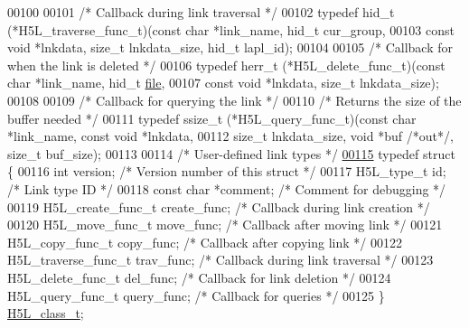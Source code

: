 \begin{DoxyCode}
00100 
00101 \textcolor{comment}{/* Callback during link traversal */}
00102 \textcolor{keyword}{typedef} hid\_t (*H5L\_traverse\_func\_t)(\textcolor{keyword}{const} \textcolor{keywordtype}{char} *link\_name, hid\_t cur\_group,
00103     \textcolor{keyword}{const} \textcolor{keywordtype}{void} *lnkdata, \textcolor{keywordtype}{size\_t} lnkdata\_size, hid\_t lapl\_id);
00104 
00105 \textcolor{comment}{/* Callback for when the link is deleted */}
00106 \textcolor{keyword}{typedef} herr\_t (*H5L\_delete\_func\_t)(\textcolor{keyword}{const} \textcolor{keywordtype}{char} *link\_name, hid\_t \hyperlink{structfile}{file},
00107     \textcolor{keyword}{const} \textcolor{keywordtype}{void} *lnkdata, \textcolor{keywordtype}{size\_t} lnkdata\_size);
00108 
00109 \textcolor{comment}{/* Callback for querying the link */}
00110 \textcolor{comment}{/* Returns the size of the buffer needed */}
00111 \textcolor{keyword}{typedef} ssize\_t (*H5L\_query\_func\_t)(\textcolor{keyword}{const} \textcolor{keywordtype}{char} *link\_name, \textcolor{keyword}{const} \textcolor{keywordtype}{void} *lnkdata,
00112     \textcolor{keywordtype}{size\_t} lnkdata\_size, \textcolor{keywordtype}{void} *buf \textcolor{comment}{/*out*/}, \textcolor{keywordtype}{size\_t} buf\_size);
00113 
00114 \textcolor{comment}{/* User-defined link types */}
\hyperlink{struct_h5_l__class__t}{00115} \textcolor{keyword}{typedef} \textcolor{keyword}{struct }\{
00116     \textcolor{keywordtype}{int} version;                    \textcolor{comment}{/* Version number of this struct        */}
00117     H5L\_type\_t id;                  \textcolor{comment}{/* Link type ID                         */}
00118     \textcolor{keyword}{const} \textcolor{keywordtype}{char} *comment;            \textcolor{comment}{/* Comment for debugging                */}
00119     H5L\_create\_func\_t create\_func;  \textcolor{comment}{/* Callback during link creation        */}
00120     H5L\_move\_func\_t move\_func;      \textcolor{comment}{/* Callback after moving link           */}
00121     H5L\_copy\_func\_t copy\_func;      \textcolor{comment}{/* Callback after copying link          */}
00122     H5L\_traverse\_func\_t trav\_func;  \textcolor{comment}{/* Callback during link traversal       */}
00123     H5L\_delete\_func\_t del\_func;     \textcolor{comment}{/* Callback for link deletion           */}
00124     H5L\_query\_func\_t query\_func;    \textcolor{comment}{/* Callback for queries                 */}
00125 \} \hyperlink{struct_h5_l__class__t}{H5L\_class\_t};

\end{DoxyCode}
